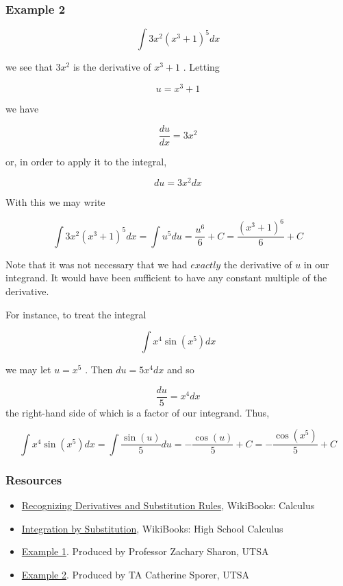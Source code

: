 \subsubsection{Example 2}
\label{sss:exam-5bdd}


\[
\int 3x^2(x^3+1)^5dx
\]


we see that $3x^2$ is the derivative of $x^3+1$ . Letting


\[
u=x^3+1
\]


we have


\[
\frac{du}{dx}=3x^2
\]


or, in order to apply it to the integral,


\[
du=3x^2dx
\]


With this we may write


\[
\int 3x^2(x^3+1)^5dx=\int u^5du=\frac{u^6}{6}+C=\frac{(x^3+1)^6}{6}+C
\]


Note that it was not necessary that we had $\textit{exactly}$ the derivative of $u$ in our integrand. It would have been sufficient to have any constant multiple of the derivative.


For instance, to treat the integral


\[
\int x^4\sin(x^5)dx
\]


we may let $u=x^5$ . Then $du=5x^4dx$ and so


\[
\frac{du}{5}=x^4dx
\] the right-hand side of which is a factor of our integrand. Thus,


\[
\int x^4\sin(x^5)dx=\int\frac{\sin(u)}{5}du=-\frac{\cos(u)}{5}+C=-\frac{\cos(x^5)}{5}+C
\]


\subsubsection{Resources}
\label{sss:reso-55b5}


\begin{itemize}
    \item \href{https://en.wikibooks.org/wiki/Calculus/Integration_techniques/Recognizing_Derivatives_and_the_Substitution_Rule}{Recognizing Derivatives and Substitution Rules}, WikiBooks: Calculus
    \item \href{https://en.wikibooks.org/wiki/High_School_Calculus/Integration_by_Substitution}{Integration by Substitution}, WikiBooks: High School Calculus
    \item \href{https://www.youtube.com/watch?v=uoCW8S-I9Es}{Example 1}. Produced by Professor Zachary Sharon, UTSA
    \item \href{https://www.youtube.com/watch?v=zqMxMtjbaBE}{Example 2}. Produced by TA Catherine Sporer, UTSA
\end{itemize}


